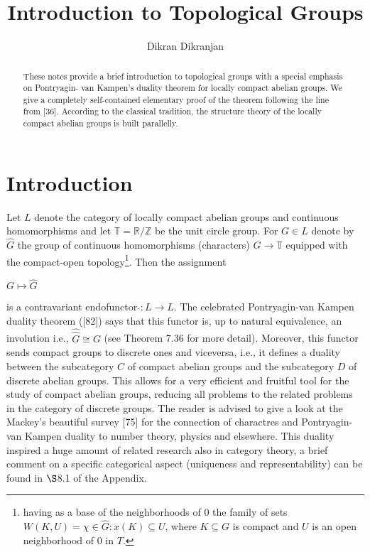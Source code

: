 \documentclass[12pt]{article}
\title{Introduction to Topological Groups}
\author{Dikran Dikranjan}
\begin{document}
\maketitle

\begin{abstract}
        These notes provide a brief introduction to topological groups with a special emphasis on Pontryagin-
    van Kampen's duality theorem for locally compact abelian groups. We give a completely self-contained 
    elementary proof of the theorem following the line from [36]. According to the classical tradition, the
    structure theory of the locally compact abelian groups is built parallelly.
\end{abstract}

\section{Introduction}


        Let $L$ denote the category of locally compact abelian groups and continuous homomorphisms and let $ \mathbb{T} = \mathbb{R} / \mathbb{Z} $
    be the unit circle group. For $G \in L$ denote by $ \widehat{G} $ the group of continuous homomorphisms (characters) $ G \to \mathbb{T} $
    equipped with the compact-open topology\footnote[1]{having as a base of the neighborhoods of 0 the family of sets $ W(K, U) = {\chi \in \widehat{G} : x(K) \subseteq U} $, where $ K \subseteq G $ is compact and
    $U$ is an open neighborhood of 0 in $T$.}. Then the assignment
    

    $G \mapsto \widehat{G}$


    is a contravariant endofunctor $ \widehat{}: L \to L $. The celebrated Pontryagin-van Kampen duality theorem ([82]) says
    that this functor is, up to natural equivalence, an involution i.e., $ \widehat{\widehat{G}} \cong G $ (see Theorem 7.36 for more detail).
    Moreover, this functor sends compact groups to discrete ones and viceversa, i.e., it defines a duality between
    the subcategory $ C $ of compact abelian groups and the subcategory $ D $ of discrete abelian groups. This allows for
    a very efficient and fruitful tool for the study of compact abelian groups, reducing all problems to the related
    problems in the category of discrete groups. The reader is advised to give a look at the Mackey's beautiful
    survey [75] for the connection of charactres and Pontryagin-van Kampen duality to number theory, physics and
    elsewhere. This duality inspired a huge amount of related research also in category theory, a brief comment on
    a specific categorical aspect (uniqueness and representability) can be found in $ \S $8.1 of the Appendix.
    
\end{document}
